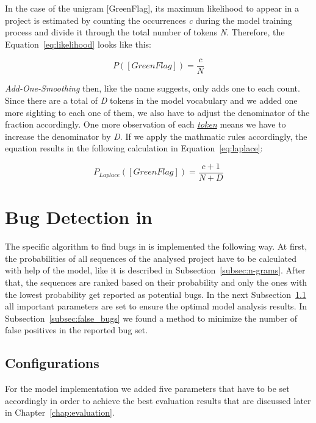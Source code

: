In the case of the unigram [GreenFlag], its maximum likelihood to appear in a \scratch{} project is estimated by counting the occurrences \textit{c} during the model training process and divide it through the total number of tokens \textit{N}. Therefore, the Equation~\ref{eq:likelihood} looks like this:

\begin{equation} \label{eq:likelihood}
P([GreenFlag]) ={} \frac{c}{N}
\end{equation}

\textit{Add-One-Smoothing} then, like the name suggests, only adds one to each count. Since there are a total of \textit{D} tokens in the model vocabulary and we added one more sighting to each one of them, we also have to adjust the denominator of the fraction accordingly. One more observation of each \hyperref[def:token]{\textit{token}} means we have to increase the denominator by \textit{D}. If we apply the mathmatic rules accordingly, the equation results in the following calculation in Equation~\ref{eq:laplace}:

\begin{equation} \label{eq:laplace}
P_{Laplace}([GreenFlag]) ={} \frac{c + 1}{N + D}
\end{equation}


\section{Bug Detection in \scratch{}}\label{sec:detection}
The specific algorithm to find bugs in \scratch{} is implemented the following way. At first, the probabilities of all sequences of the analysed project have to be calculated with help of the model, like it is described in Subsection~\ref{subsec:n-grams}. After that, the sequences are ranked based on their probability and only the ones with the lowest probability get reported as potential bugs. In the next Subsection~\ref{subsec:configurations} all important parameters are set to ensure the optimal model analysis results. In Subsection~\ref{subsec:false_bugs} we found a method to minimize the number of false positives in the reported bug set.

\subsection{Configurations}\label{subsec:configurations}
For the \scratch{} model implementation we added five parameters that have to be set accordingly in order to achieve the best evaluation results that are discussed later in Chapter~\ref{chap:evaluation}.

